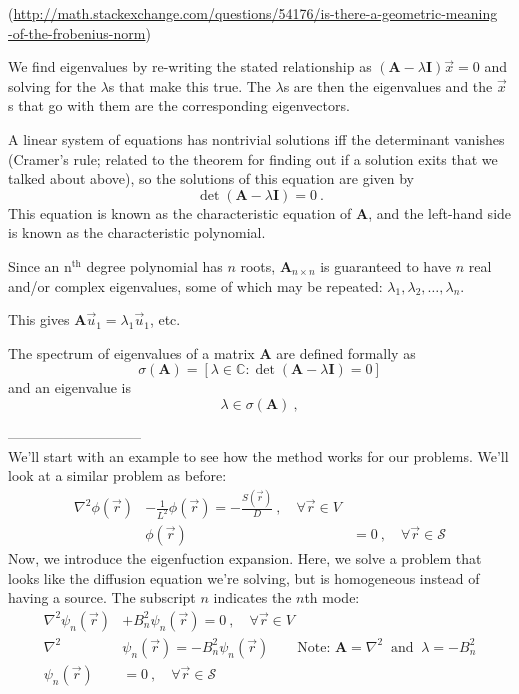 \documentclass[12pt]{article}
\newcommand{\nth}{n\ensuremath{^{\text{th}}} }
\newcommand{\ve}[1]{\ensuremath{\mathbf{#1}}}
\begin{document}
(\url{http://math.stackexchange.com/questions/54176/is-there-a-geometric-meaning}\\ \url{-of-the-frobenius-norm})
 
We find eigenvalues by re-writing the stated relationship as $(\ve{A} - \lambda \ve{I})\vec{x}=0$ and solving for the $\lambda$s that make this true. The $\lambda$s are then the eigenvalues and the $\vec{x}$s that go with them are the corresponding eigenvectors. 

A linear system of equations has nontrivial solutions iff the determinant vanishes (Cramer's rule; related to the theorem for finding out if a solution exits that we talked about above), so the solutions of this equation are given by
%
\[\det(\ve{A} - \lambda \ve{I})=0 \:.\] 	
%
This equation is known as the characteristic equation of $\ve{A}$, and the left-hand side is known as the characteristic polynomial.

Since an \nth degree polynomial has $n$ roots, $\ve{A}_{n \times n}$ is guaranteed to have $n$ real and/or complex eigenvalues, some of which may be repeated: $\lambda_1, \lambda_2, \dots, \lambda_n$.

This gives $\ve{A}\vec{u}_1 = \lambda_1 \vec{u}_1$, etc.

The spectrum of eigenvalues of a matrix $\ve{A}$ are defined formally as
\[\sigma(\ve{A}) = [ \lambda \in \mathbb{C} : \det(\ve{A} - \lambda \ve{I})=0] \] 
and an eigenvalue is 
\[ \lambda \in \sigma(\ve{A})\:,\]

-----------------------------\\
We'll start with an example to see how the method works for our problems. We'll look at a similar problem as before:
\begin{align*}
\nabla^2\phi(\vec{r}) &- \frac{1}{L^2}\phi(\vec{r}) = -\frac{S(\vec{r})}{D} \:, \quad \forall \vec{r} \in V \\
& \phi(\vec{r}) &= 0\:, \quad \forall \vec{r} \in \mathcal{S}
\end{align*}
Now, we introduce the eigenfuction expansion. Here, we solve a problem that looks like the diffusion equation we're solving, but is homogeneous instead of having a source. The subscript $n$ indicates the $n$th mode:
\begin{align*}
\nabla^2 \psi_n (\vec{r}) &+ B_n^2 \psi_n (\vec{r}) = 0\:, \quad \forall \vec{r} \in V  \\
%
\nabla^2 &\psi_n (\vec{r}) =  -B_n^2 \psi_n (\vec{r}) \qquad \text{Note: } \ve{A} = \nabla^2\: \text{ and }\: \lambda = -B_n^2\\
\psi_n (\vec{r}) &= 0\:, \quad \forall \vec{r} \in \mathcal{S}
\end{align*}
\end{document}
